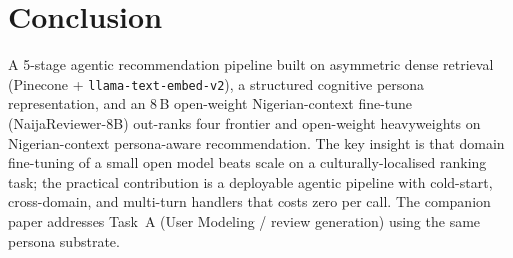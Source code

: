 \documentclass[sigconf,nonacm,balance]{acmart}
\begin{document}
\section{Conclusion}

A 5-stage agentic recommendation pipeline built on asymmetric dense
retrieval (Pinecone + \texttt{llama-text-embed-v2}), a structured
cognitive persona representation, and an 8\,B open-weight Nigerian-context
fine-tune (NaijaReviewer-8B) out-ranks four frontier and open-weight
heavyweights on Nigerian-context persona-aware recommendation. The
key insight is that domain fine-tuning of a small open model beats
scale on a culturally-localised ranking task; the practical
contribution is a deployable agentic pipeline with cold-start,
cross-domain, and multi-turn handlers that costs zero per call. The
companion paper addresses Task~A (User Modeling / review generation)
using the same persona substrate.



\end{document}
